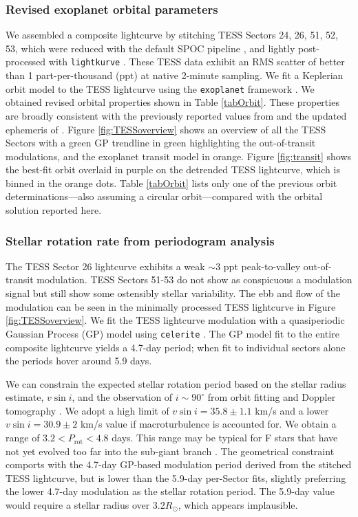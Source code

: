 \documentclass[twocolumn]{aastex631}
\begin{document}
\subsubsection{Revised exoplanet orbital parameters}
We assembled a composite lightcurve by stitching TESS Sectors 24, 26, 51, 52, 53, which were reduced with the default SPOC pipeline \citep{2020RNAAS...4..201C}, and lightly post-processed with \texttt{lightkurve} \citep{geert_barentsen_2019_2565212}.  These TESS data exhibit an RMS scatter of better than 1 part-per-thousand (ppt) at native 2-minute sampling.  We fit a Keplerian orbit model to the TESS lightcurve using the \texttt{exoplanet} framework \citep{exoplanet:joss}.  We obtained revised orbital properties shown in Table \ref{tabOrbit}.  These properties are broadly consistent with the previously reported values from \citet{2017AJ....153..211Z} and the updated ephemeris of \citet{2022ApJS..259...62I}.  Figure \ref{fig:TESSoverview} shows an overview of all the TESS Sectors with a green GP trendline in green highlighting the out-of-transit modulations, and the exoplanet transit model in orange.  Figure \ref{fig:transit} shows the best-fit orbit overlaid in purple on the detrended TESS lightcurve, which is binned in the orange dots.  Table \ref{tabOrbit} lists only one of the previous orbit determinations---also assuming a circular orbit---compared with the orbital solution reported here.

\subsubsection{Stellar rotation rate from periodogram analysis}\label{TESSmodulation}

The TESS Sector 26 lightcurve exhibits a weak $\sim$3 ppt peak-to-valley out-of-transit modulation. TESS Sectors 51-53 do not show as conspicuous a modulation signal but still show some ostensibly stellar variability.  The ebb and flow of the modulation can be seen in the minimally processed TESS lightcurve in Figure \ref{fig:TESSoverview}.  We fit the TESS lightcurve modulation with a quasiperiodic Gaussian Process (GP) model using \texttt{celerite} \citep{celerite1,celerite2}.  The GP model fit to the entire composite lightcurve yields a 4.7-day period; when fit to individual sectors alone the periods hover around 5.9 days.

We can constrain the expected stellar rotation period based on the stellar radius estimate, $v\sin{i}$, and the observation of $i\sim90^\circ$ from orbit fitting and Doppler tomography \citep{2017AJ....153..211Z}.  We adopt a high limit of $v\sin{i}=35.8\pm1.1$ km/s and a lower $v\sin{i}=30.9\pm2$ km/s value if macroturbulence is accounted for.  We obtain a range of $3.2 < P_\mathrm{rot}  < 4.8 $ days.  This range may be typical for F stars that have not yet evolved too far into the sub-giant branch \citep{2022ApJ...930....7A}.  The geometrical constraint comports with the 4.7-day GP-based modulation period derived from the stitched TESS lightcurve, but is lower than the 5.9-day per-Sector fits, slightly preferring the lower 4.7-day modulation as the stellar rotation period.  The 5.9-day value would require a stellar radius over 3.2$R_\odot$, which appears implausible.
\end{document}

